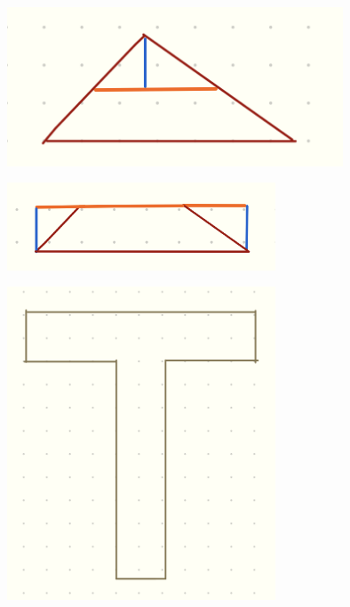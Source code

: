 \documentclass{article}
\begin{document}
\begin{figure}[ht]
    \centering
    \includegraphics[width=10cm]{Capstone Presentation/Draft Diagrams/Section 2 Diagrams/3.3 Rough Diagrams 5.png}
    \caption{}
    \label{Fig_Rough_5}
\end{figure}

\begin{figure}[ht]
    \centering
    \includegraphics[width=8cm]{Capstone Presentation/Draft Diagrams/Section 2 Diagrams/3.3 Rough Diagrams 6.png}
    \caption{}
    \label{Fig_Rough_6}
\end{figure}

\begin{figure}[ht]
    \centering
    \includegraphics[width=8cm]{Capstone Presentation/Draft Diagrams/Section 2 Diagrams/3.3 Rough Diagrams 7.png}
    \caption{}
    \label{Fig_Rough_7}
\end{figure}
\end{document}

